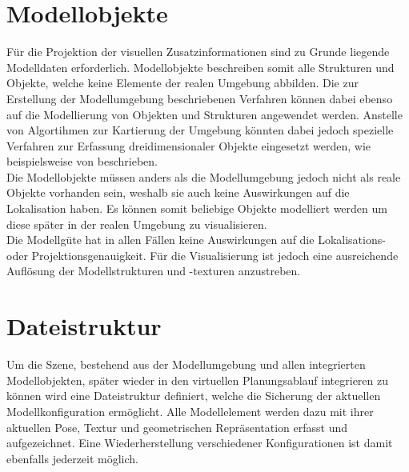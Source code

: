 \section{Modellobjekte}
Für die Projektion der visuellen Zusatzinformationen sind zu Grunde liegende Modelldaten erforderlich. Modellobjekte beschreiben somit alle Strukturen und Objekte, welche keine Elemente der realen Umgebung abbilden. Die zur Erstellung der Modellumgebung beschriebenen Verfahren können dabei ebenso auf die Modellierung von Objekten und Strukturen angewendet werden. Anstelle von Algortihmen zur Kartierung der Umgebung könnten dabei jedoch spezielle Verfahren zur Erfassung dreidimensionaler Objekte eingesetzt werden, wie beispielsweise von \cite{Xu2012} beschrieben.\\
Die Modellobjekte müssen anders als die Modellumgebung jedoch nicht als reale Objekte vorhanden sein, weshalb sie auch keine Auswirkungen auf die Lokalisation haben. Es können somit beliebige Objekte modelliert werden um diese später in der realen Umgebung zu visualisieren.\\
Die Modellgüte hat in allen Fällen keine Auswirkungen auf die Lokalisations- oder Projektionsgenauigkeit. Für die Visualisierung ist jedoch eine ausreichende Auflösung der Modellstrukturen und -texturen anzustreben.\\

\section{Dateistruktur}
Um die Szene, bestehend aus der Modellumgebung und allen integrierten Modellobjekten, später wieder in den virtuellen Planungsablauf integrieren zu können wird eine Dateistruktur definiert, welche die Sicherung der aktuellen Modellkonfiguration ermöglicht. Alle Modellelement werden dazu mit ihrer aktuellen Pose, Textur und geometrischen Repräsentation erfasst und aufgezeichnet. Eine Wiederherstellung verschiedener Konfigurationen ist damit ebenfalls jederzeit möglich.\\
